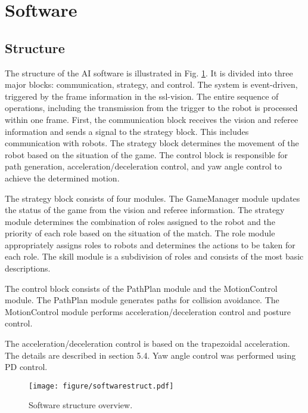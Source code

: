\documentclass[]{llncs}
\begin{document}
\section{Software}
%
\subsection{Structure}
%
The structure of the AI software is illustrated in Fig. \ref{fig:softwarestruct}.
%
It is divided into three major blocks: communication, strategy, and control.
%
The system is event-driven, triggered by the frame information in the ssl-vision. The entire sequence of operations, including the transmission from the trigger to the robot is processed within one frame.
%
First, the communication block receives the vision and referee information and sends a signal to the strategy block.
%
This includes communication with robots. The strategy block determines the movement of the robot based on the situation of the game.
%
The control block is responsible for path generation, acceleration/deceleration control, and yaw angle control to achieve the determined motion.
%

The strategy block consists of four modules. The GameManager module updates the status of the game from the vision and referee information.
%
The strategy module determines the combination of roles assigned to the robot and the priority of each role based on the situation of the match.
%
The role module appropriately assigns roles to robots and determines the actions to be taken for each role. The skill module is a subdivision of roles and consists of the most basic descriptions.
%

The control block consists of the PathPlan module and the MotionControl module.
%
The PathPlan module generates paths for collision avoidance. The MotionControl module performs acceleration/deceleration control and posture control.
%

The acceleration/deceleration control is based on the trapezoidal acceleration. The details are described in section 5.4. Yaw angle control was performed using PD control.
%
\begin{figure}[ttbp]
    \centering
    \texttt{[image: figure/softwarestruct.pdf]}
    \caption{Software structure overview.}
    \label{fig:softwarestruct}
\end{figure}
\end{document}
